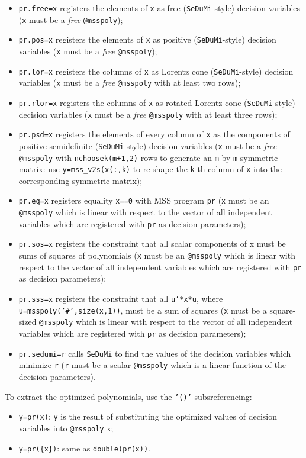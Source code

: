 \documentclass[12pt]{article}
\begin{document}
\begin{itemize}
\item {\tt pr.free=x} registers the elements of {\tt x} as free ({\tt SeDuMi}-style) decision
variables ({\tt x} must be a {\sl free} {\tt @msspoly});
\item {\tt pr.pos=x} registers the elements of {\tt x} as positive ({\tt SeDuMi}-style) decision
variables ({\tt x} must be a {\sl free} {\tt @msspoly});
\item {\tt pr.lor=x} registers the columns of {\tt x} as Lorentz cone ({\tt SeDuMi}-style) decision
variables ({\tt x} must be a {\sl free} {\tt @msspoly} with at least two rows);
\item {\tt pr.rlor=x} registers the columns of {\tt x} as rotated Lorentz cone 
({\tt SeDuMi}-style) decision
variables ({\tt x} must be a {\sl free} {\tt @msspoly} with at least three rows);
\item {\tt pr.psd=x} registers the elements of every  column of
{\tt x} as the components of positive semidefinite ({\tt SeDuMi}-style) decision
variables ({\tt x} must be a {\sl free} {\tt @msspoly} with {\tt nchoosek(m+1,2)}
rows to generate an {\tt m}-by-{\tt m} symmetric matrix: use
{\tt y=mss\_v2s(x(:,k)} to re-shape the {\tt k}-th column
of {\tt x} into the corresponding symmetric matrix);
\item {\tt pr.eq=x} registers equality {\tt x==0} with MSS program {\tt pr}
({\tt x} must be an {\tt @msspoly} which is linear with respect to the vector
of all independent variables which are registered with {\tt pr} as decision
parameters);
\item {\tt pr.sos=x} registers the constraint that
all scalar components of x must be sums of squares of polynomials
({\tt x} must be an {\tt @msspoly} which is linear with respect to the vector
of all independent variables which are registered with {\tt pr} as decision
parameters);
\item {\tt pr.sss=x} registers the constraint that
all {\tt u'*x*u}, where \newline 
{\tt u=msspoly('\#',size(x,1))}, must be a sum of squares
({\tt x} must be a square-sized {\tt @msspoly} which is linear 
with respect to the vector
of all independent variables which are registered with {\tt pr} as decision
parameters);
\item {\tt pr.sedumi=r} calls {\tt SeDuMi} to find the values of the decision
variables which minimize {\tt r} ({\tt r} must be a scalar {\tt @msspoly} 
which is a linear function of the decision parameters).
\end{itemize}
To extract the optimized polynomials, use the {\tt '()'} subsreferencing:
\begin{itemize}
\item {\tt y=pr(x)}: {\tt y} is the result of substituting the optimized values
of decision variables into {\tt @msspoly} x;
\item {\tt y=pr(\{x\})}: same as {\tt double(pr(x))}.
\end{itemize}
\end{document}
